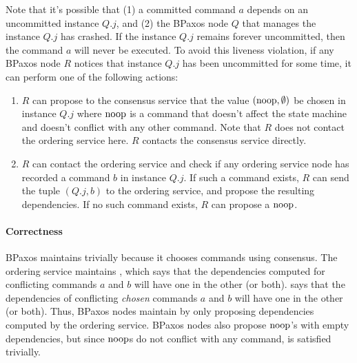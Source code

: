 Note that it's possible that (1) a committed command $a$ depends on an
uncommitted instance $Q.j$, and (2) the BPaxos node $Q$ that manages the
instance $Q.j$ has crashed. If the instance $Q.j$ remains forever uncommitted,
then the command $a$ will never be executed. To avoid this liveness violation,
if any BPaxos node $R$ notices that instance $Q.j$ has been uncommitted for
some time, it can perform one of the following actions:
\begin{enumerate}
  \item
    $R$ can propose to the consensus service that the value $(\text{noop},
    \emptyset)$ be chosen in instance $Q.j$ where $\text{noop}$ is a command that
    doesn't affect the state machine and doesn't conflict with any other
    command. Note that $R$ does not contact the ordering service here. $R$
    contacts the consensus service directly.

  \item
    $R$ can contact the ordering service and check if any ordering service node
    has recorded a command $b$ in instance $Q.j$. If such a command exists, $R$
    can send the tuple $(Q.j, b)$ to the ordering service, and propose the
    resulting dependencies. If no such command exists, $R$ can propose a
    $\text{noop}$.
\end{enumerate}

\paragraph{Correctness}
BPaxos maintains  trivially because it chooses commands
using consensus. The ordering service maintains , which
says that the dependencies computed for conflicting commands $a$ and $b$ will
have one in the other (or both).  says that the
dependencies of conflicting \emph{chosen} commands $a$ and $b$ will have one in
the other (or both). Thus, BPaxos nodes maintain  by
only proposing dependencies computed by the ordering service. BPaxos nodes also
propose $\text{noop}$'s with empty dependencies, but since $\text{noop}$s do not conflict
with any command,  is satisfied trivially.

